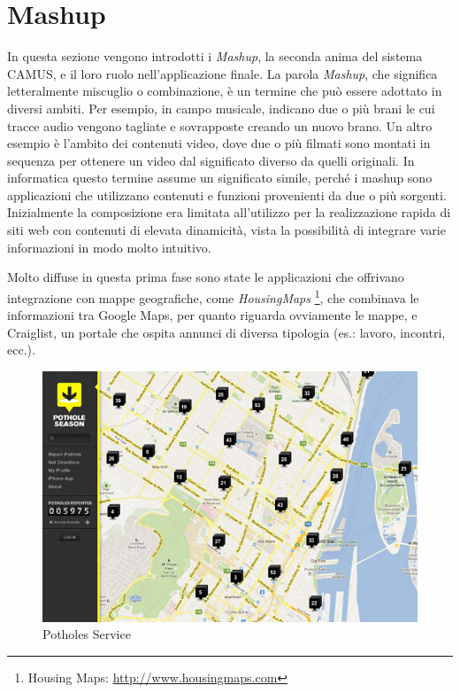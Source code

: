 \section{Mashup\label{sec:mashup}}

In questa sezione vengono introdotti i \emph{Mashup}, la seconda anima del sistema CAMUS, e il loro ruolo nell'applicazione finale.
La parola \emph{Mashup}, che significa letteralmente miscuglio o combinazione, è un termine che può essere adottato in diversi ambiti.
Per esempio, in campo musicale, indicano due o più brani le cui tracce audio vengono tagliate e sovrapposte creando un nuovo brano. Un altro esempio è l'ambito dei contenuti video, dove due o più filmati sono montati in sequenza per ottenere un video dal significato diverso da quelli originali.
In informatica questo termine assume un significato simile, perché i mashup sono applicazioni che utilizzano contenuti e funzioni provenienti da due o più sorgenti\cite{DBLP:books/sp/DanielM14}.
Inizialmente la composizione era limitata all'utilizzo per la realizzazione rapida di siti web con contenuti di elevata dinamicità, vista la possibilità di integrare varie informazioni in modo molto intuitivo.

Molto diffuse in questa prima fase sono state le applicazioni che offrivano integrazione con mappe geografiche, come \emph{HousingMaps} \footnote{Housing Maps: \url{http://www.housingmaps.com}}, che combinava le informazioni tra Google Maps, per quanto riguarda ovviamente le mappe, e Craiglist, un portale che ospita annunci di diversa tipologia (es.: lavoro, incontri, ecc.).
\begin{figure}[ht]
	\centering
	\includegraphics[width=\textwidth]{2-nozioni-preliminari/Immagini/potholes_service.jpg}
	\caption{Potholes Service}\label{fig:potholes}
\end{figure}

